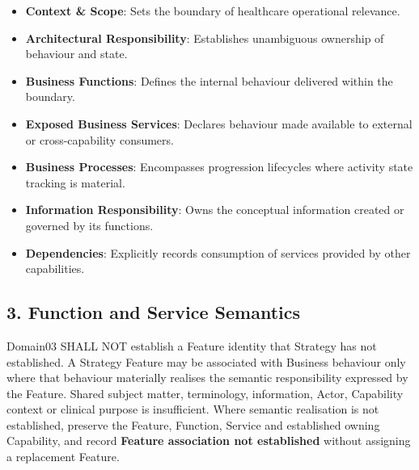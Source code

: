 \begin{itemize}

\item
\textbf{Context \& Scope}: Sets the boundary of healthcare operational relevance.



\item
\textbf{Architectural Responsibility}: Establishes unambiguous ownership of behaviour and state.



\item
\textbf{Business Functions}: Defines the internal behaviour delivered within the boundary.



\item
\textbf{Exposed Business Services}: Declares behaviour made available to external or cross-capability consumers.



\item
\textbf{Business Processes}: Encompasses progression lifecycles where activity state tracking is material.



\item
\textbf{Information Responsibility}: Owns the conceptual information created or governed by its functions.



\item
\textbf{Dependencies}: Explicitly records consumption of services provided by other capabilities.



\end{itemize}
\label{rad:metamodel:91}

\par\smallskip
{}\label{rad:metamodel:93}
\subsection*{3. Function and Service Semantics}
\label{rad:metamodel:95}

Domain03 SHALL NOT establish a Feature identity that Strategy has not established. A Strategy Feature may be associated with Business behaviour only where that behaviour materially realises the semantic responsibility expressed by the Feature. Shared subject matter, terminology, information, Actor, Capability context or clinical purpose is insufficient. Where semantic realisation is not established, preserve the Feature, Function, Service and established owning Capability, and record \textbf{Feature association not established} without assigning a replacement Feature.

